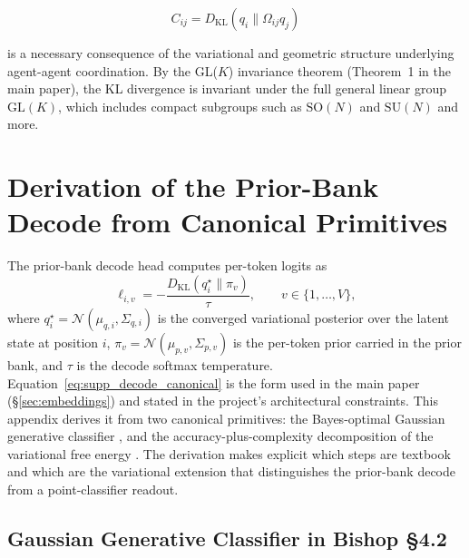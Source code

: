\documentclass[twoside,11pt]{article}
\begin{document}
\[
\boxed{
C_{ij}=D_{\mathrm{KL}}(q_i \| \Omega_{ij} q_j)}
\]

is a necessary consequence of the variational and geometric structure underlying agent-agent coordination. By the GL($K$) invariance theorem (Theorem~1 in the main paper), the KL divergence is invariant under the full general linear group $\mathrm{GL}(K)$, which includes compact subgroups such as $\mathrm{SO}(N)$ and $\mathrm{SU}(N)$ and more.


\section{Derivation of the Prior-Bank Decode from Canonical Primitives}
\label{sec:supp_decode_derivation}

The prior-bank decode head computes per-token logits as
\begin{equation}
\ell_{i,v} = -\frac{D_{\mathrm{KL}}(q_i^{\star} \| \pi_v)}{\tau},
\qquad
v \in \{1,\dots,V\},
\label{eq:supp_decode_canonical}
\end{equation}
where $q_i^{\star} = \mathcal{N}(\mu_{q,i}, \Sigma_{q,i})$ is the converged variational posterior over the latent state at position $i$, $\pi_v = \mathcal{N}(\mu_{p,v}, \Sigma_{p,v})$ is the per-token prior carried in the prior bank, and $\tau$ is the decode softmax temperature. Equation~\eqref{eq:supp_decode_canonical} is the form used in the main paper (\S\ref{sec:embeddings}) and stated in the project's architectural constraints. This appendix derives it from two canonical primitives: the Bayes-optimal Gaussian generative classifier \cite[\S4.2]{Bishop2006}, and the accuracy-plus-complexity decomposition of the variational free energy \cite{Friston2010,Blei2017}. The derivation makes explicit which steps are textbook and which are the variational extension that distinguishes the prior-bank decode from a point-classifier readout.

\subsection{Gaussian Generative Classifier in Bishop \S4.2}
\end{document}
